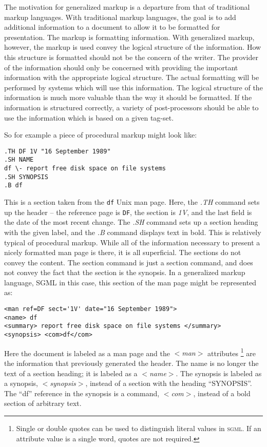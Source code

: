 The motivation for generalized markup is a departure from that of 
traditional markup languages. With traditional markup languages, the goal 
is to add additional information to a document to allow it to be formatted
for presentation. The markup is formatting information. With generalized
markup, however, the markup is used convey the logical structure of
the information. How this structure is formatted should not be the
concern of the writer. The provider of the information should only
be concerned with providing the important information with the appropriate
logical structure. The actual formatting will be performed by systems
which will use this information. The logical structure of the information 
is much more valuable than the way it should be formatted. If the
information is structured correctly, a variety of post-processors should
be able to use the information which is based on a given tag-set.

So for example a piece of procedural markup might look like:
\begin{verbatim}
.TH DF 1V "16 September 1989"
.SH NAME
df \- report free disk space on file systems
.SH SYNOPSIS
.B df
\end{verbatim}
\noindent
This is a section taken from the \texttt{df} Unix man page. Here, the \emph{.TH} 
command sets up the header -- the reference page is \texttt{DF}, the section 
is \emph{1V}, and the last field is the date of the most recent change. 
The \emph{.SH} command sets up a section heading with the given label, and
the \emph{.B} command displays text in bold. This is relatively typical
of procedural markup. While all of the information necessary to present
a nicely formatted man page is there, it is all superficial. The sections
do not convey the content. The section command is just a section command,
and does not convey the fact that the section is the synopsis. In
a generalized markup language, \textsc{SGML} in this case, this section of
the man page might be represented as:
\begin{verbatim}
<man ref=DF sect='1V' date="16 September 1989">
<name> df 
<summary> report free disk space on file systems </summary> 
<synopsis> <com>df</com>
\end{verbatim}
\noindent
Here the document is labeled as a man page and the \textit{$<$man$>$} attributes
\footnote{Single or double quotes can be used to distinguish literal
values in \textsc{sgml}. If an attribute value is a single word, quotes are
not required.} are the information that previously generated the header.
The name is no longer the text of a section heading; it is labeled as 
a \textit{$<$name$>$}. The synopsis is labeled as a synopsis, \textit{$<$synopsis$>$}, 
instead of a section with the heading ``SYNOPSIS''. The ``df'' reference
in the synopsis is a command, \textit{$<$com$>$}, instead of a bold section
of arbitrary text.

